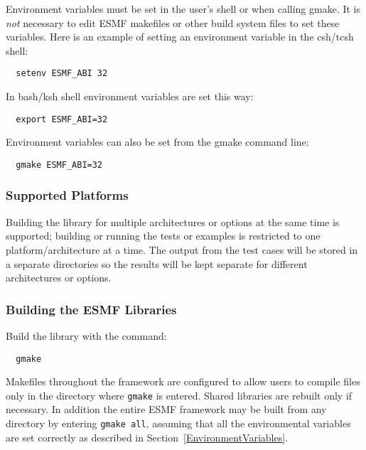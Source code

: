 \begin{description}
\end{description}

Environment variables must be set in the user's shell or when calling gmake. It
is {\em not} necessary to edit ESMF makefiles or other build system files to set
these variables. Here is an example of setting an environment variable in the
csh/tcsh shell:

\begin{verbatim}
  setenv ESMF_ABI 32
\end{verbatim}

In bash/ksh shell environment variables are set this way:

\begin{verbatim}
  export ESMF_ABI=32
\end{verbatim}

Environment variables can also be set from the gmake command line:

\begin{verbatim}
  gmake ESMF_ABI=32
\end{verbatim}

\subsubsection{Supported Platforms}


Building the library for multiple architectures or options at the same
time is supported; building or running the tests or examples is restricted
to one platform/architecture at a time.  The output from the test cases
will be stored in a separate directories so the results will be kept 
separate for different architectures or options.

\subsubsection{Building the ESMF Libraries}
\label{BuildESMF}



Build the library with the command:
\begin{verbatim}
  gmake 
\end{verbatim}


Makefiles throughout the framework are configured to allow users to
compile files only in the directory where {\tt gmake} is entered. Shared
libraries are rebuilt only if necessary. In addition the entire ESMF
framework may be built from any directory by entering {\tt gmake all},
assuming that all the environmental variables are set correctly as
described in Section~\ref{EnvironmentVariables}.

